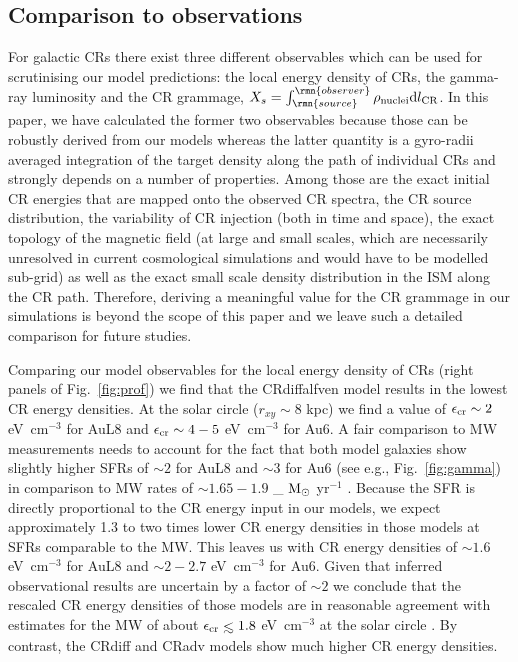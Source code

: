 \documentclass[useAMS,usenatbib]{mnras}
\newcommand{\Msun}{{\ifmmode{{\rm M}_{\odot}}\else{${\rm M}_{\odot}$}\fi}}
\def\lesssim{\mathrel{\hbox{\rlap{\hbox{\lower4pt\hbox{$\sim$}}}\hbox{$<$}}}}
\def \Msun {\ifmmode {\rm M}_{\odot} \else ${\rm M}_{\odot}$ \fi}
\begin{document}
\subsection{Comparison to observations}
\label{sec:obs_comp}

For galactic CRs there exist three different observables which can be used for scrutinising our model predictions: the local energy density of CRs, the gamma-ray luminosity and the CR grammage, $X_s=\int_\rmn{source}^\rmn{observer}\rho_{\rm nuclei}{\rm{d}} l_{\rm CR}$. In this paper, we have calculated the former two observables because those can be robustly derived from our models whereas the latter quantity is a gyro-radii averaged integration of the target density along the path of individual CRs and strongly depends on a number of properties. Among those are the exact initial CR energies that are mapped onto the observed CR spectra, the CR source distribution, the variability of CR injection (both in time and space), the exact topology of the magnetic field (at large and small scales, which are necessarily unresolved in current cosmological simulations and would have to be modelled sub-grid) as well as the exact small scale density distribution in the ISM along the CR path. Therefore, deriving a meaningful value for the CR grammage in our simulations is beyond the scope of this paper and we leave such a detailed comparison for future studies.

Comparing our model observables for the local energy density of CRs (right panels of Fig.\ \ref{fig:prof}) we find that the CRdiffalfven model results in the lowest CR energy densities.
At the solar circle ($r_{xy}\sim8$ kpc) we find a value of $\epsilon_{\rm cr}\sim2$ eV~cm$^{-3}$ for AuL8 and $\epsilon_{\rm cr}\sim4-5$ eV~cm$^{-3}$ for Au6. A fair comparison to MW measurements needs to account for the fact that both model galaxies show slightly higher SFRs
of $\sim2$ for AuL8 and $\sim3$ for Au6 (see e.g., Fig.\ \ref{fig:gamma}) 
in comparison to MW rates of $\sim1.65-1.9$ \Msun yr$^{-1}$ \citep[e.g.,][]{Chomiuk2011,Licquia2015}. Because the SFR is directly proportional to the CR energy input in our models, we expect approximately 1.3 to two times lower CR energy densities in those models at SFRs comparable to the MW. This leaves us with CR energy densities of $\sim1.6$ eV~cm$^{-3}$ for AuL8 and $\sim2-2.7$ eV~cm$^{-3}$ for Au6. Given that inferred observational results are uncertain by a factor of $\sim2$ \citep[see e.g. discussion in][]{Cummings2016} we conclude that the rescaled CR energy densities of those models are in reasonable agreement with estimates for the MW of about $\epsilon_{\rm cr}\lesssim1.8$ eV~cm$^{-3}$ at the solar circle \citep[e.g.][]{Boulares1990,Webber1998,Cummings2016}. By contrast, the CRdiff and CRadv models show much higher CR energy densities.
\end{document}
